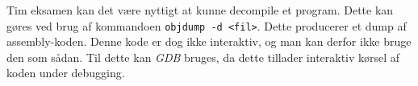 Tim eksamen kan det være nyttigt at kunne decompile et program.
Dette kan gøres ved brug af kommandoen \verb|objdump -d <fil>|.
Dette producerer et dump af assembly-koden.
Denne kode er dog ikke interaktiv, og man kan derfor ikke bruge den som sådan.
Til dette kan \textit{GDB} bruges, da dette tillader interaktiv kørsel af koden under debugging.
